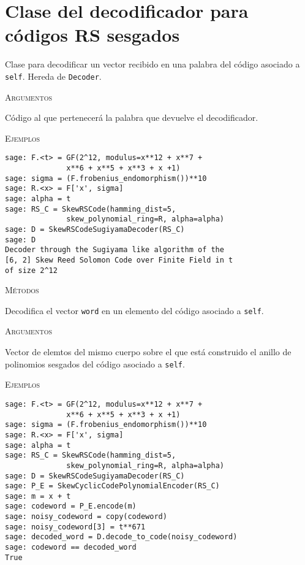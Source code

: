 \section{Clase del decodificador para códigos RS sesgados}
\begin{description}[font=\ttfamily, style=nextline]
    \item[class SkewRSCodeSugiyamaDecoder(self, code)]
    Clase para decodificar un vector recibido en una palabra del código asociado a \texttt{self}. Hereda de \texttt{Decoder}.

    \textsc{Argumentos}
    \begin{description}[font=\ttfamily, style=nextline]
        \item[code]
        Código al que pertenecerá la palabra que devuelve el decodificador.
    \end{description}

    \textsc{Ejemplos}
    \begin{lstlisting}
sage: F.<t> = GF(2^12, modulus=x**12 + x**7 +
              x**6 + x**5 + x**3 + x +1)
sage: sigma = (F.frobenius_endomorphism())**10
sage: R.<x> = F['x', sigma]
sage: alpha = t
sage: RS_C = SkewRSCode(hamming_dist=5,
              skew_polynomial_ring=R, alpha=alpha)
sage: D = SkewRSCodeSugiyamaDecoder(RS_C)
sage: D
Decoder through the Sugiyama like algorithm of the
[6, 2] Skew Reed Solomon Code over Finite Field in t
of size 2^12
    \end{lstlisting}

    \textsc{Métodos}
    \begin{description}[font=\ttfamily, style=nextline]
        \item[decode\_to\_code(self, word)]
        Decodifica el vector \texttt{word} en un elemento del código asociado a \texttt{self}.

        \textsc{Argumentos}
        \begin{description}[font=\ttfamily, style=nextline]
            \item[word]
            Vector de elemtos del mismo cuerpo sobre el que está construido el anillo de polinomios
            sesgados del código asociado a \texttt{self}.
        \end{description}

        \textsc{Ejemplos}
        \begin{lstlisting}
sage: F.<t> = GF(2^12, modulus=x**12 + x**7 +
              x**6 + x**5 + x**3 + x +1)
sage: sigma = (F.frobenius_endomorphism())**10
sage: R.<x> = F['x', sigma]
sage: alpha = t
sage: RS_C = SkewRSCode(hamming_dist=5,
              skew_polynomial_ring=R, alpha=alpha)
sage: D = SkewRSCodeSugiyamaDecoder(RS_C)
sage: P_E = SkewCyclicCodePolynomialEncoder(RS_C)
sage: m = x + t
sage: codeword = P_E.encode(m)
sage: noisy_codeword = copy(codeword)
sage: noisy_codeword[3] = t**671
sage: decoded_word = D.decode_to_code(noisy_codeword)
sage: codeword == decoded_word
True
        \end{lstlisting}


\end{description}
\end{description}
